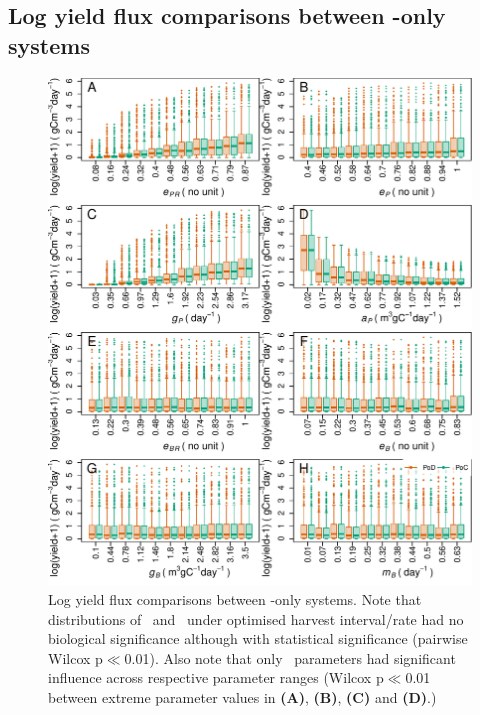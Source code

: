 \documentclass[../thesis.tex]{subfiles} %
\begin{document}
\subsection{Log yield flux comparisons between \phy-only systems}
\begin{figure}[H]
    \centering
    \includegraphics[width=.95\linewidth]{result/harvP.pdf}
    \caption[Log yield flux comparisons between \phy-only systems]{Log yield flux comparisons between \phy-only systems.  Note that distributions of \PoH\ and \PoN\ under optimised harvest interval/rate had no biological significance although with statistical significance (pairwise Wilcox p$\ll$0.01).  Also note that only \phy\ parameters had significant influence across respective parameter ranges (Wilcox p$\ll$0.01 between extreme parameter values in \textbf{(A)}, \textbf{(B)}, \textbf{(C)} and \textbf{(D)}.)\lnExplain}
    \label{f:harvPo}
\end{figure}
\end{document}
